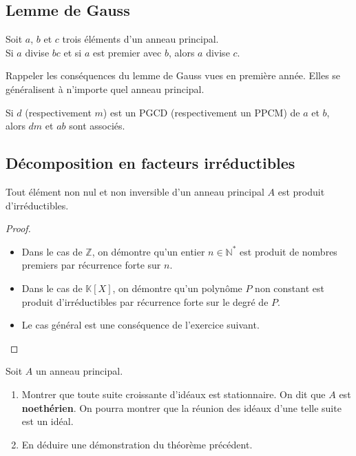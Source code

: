 \documentclass[french]{article}
\newcommand{\N}{\mathbb{N}}
\newcommand{\Z}{\mathbb{Z}}
\newcommand{\K}{\mathbb{K}}
\newcommand{\st}{^*}
\theoremstyle{plain}
\theoremstyle{definition}
\theoremstyle{remark}
\begin{document}
\subsection{Lemme de Gauss}

\begin{thm}%
	Soit $a$, $b$ et $c$ trois éléments d'un anneau principal.\\
	Si $a$ divise $bc$ et si $a$ est premier avec $b$, alors $a$ divise $c$.
\end{thm}

\begin{exo}
	Rappeler les conséquences du lemme de Gauss vues en première année. Elles se généralisent à n'importe quel anneau principal.
\end{exo}

\begin{prop}%
	Si $d$ (respectivement $m$) est un PGCD (respectivement un PPCM) de $a$ et $b$, alors $dm$ et $ab$ sont associés.
\end{prop}

\subsection{Décomposition en facteurs irréductibles}

\begin{thm}%
	Tout élément non nul et non inversible d'un anneau principal $A$ est produit d'irréductibles.
\end{thm}
\begin{proof}
	\begin{itemize}
		\item Dans le cas de $\Z$, on démontre qu'un entier $n\in\N\st$ est produit de nombres premiers par récurrence forte sur $n$.
		\item Dans le cas de $\K[X]$, on démontre qu'un polynôme $P$ non constant est produit d'irréductibles par récurrence forte sur le degré de $P$.
		\item Le cas général est une conséquence de l'exercice suivant.
	\end{itemize}
\end{proof}

\begin{exo}
	Soit $A$ un anneau principal.
	\begin{enumerate}
		\item Montrer que toute suite croissante d'idéaux est stationnaire. On dit que $A$ est \textbf{noethérien}. On pourra montrer que la réunion des idéaux d'une telle suite est un idéal.
		\item En déduire une démonstration du théorème précédent.
	\end{enumerate}
\end{exo}
\end{document}
